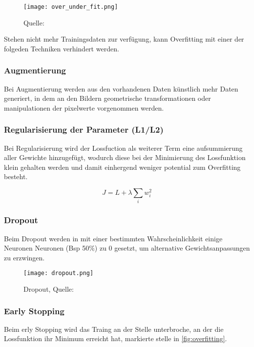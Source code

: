 \begin{figure}[H]
    \centering
    \texttt{[image: over\_under\_fit.png]}
    \caption{Quelle: \cite{deshpGuideImprovingDeep2017a}}
    \label{fig:over_under_fit}
\end{figure}


Stehen nicht mehr Trainingsdaten zur verfügung, kann Overfitting
mit einer der folgeden Techniken verhindert werden.


\subsubsection{Augmentierung}
Bei Augmentierung werden aus den vorhandenen Daten künstlich mehr 
Daten generiert, in dem an den Bildern geometrische transformationen 
oder manipulationen der pixelwerte vorgenommen werden.

\subsubsection{Regularisierung der Parameter (L1/L2)}
Bei Regularisierung wird der Lossfuction als weiterer Term
eine aufsummierung aller Gewichte hinzugefügt,
wodurch diese bei der Minimierung des Lossfunktion 
klein gehalten werden und damit einhergend weniger potential 
zum Overfitting besteht.

\begin{equation}
    \label{eq:regularization}
    J = L + \lambda \sum_{i} w_{i}^{2}
\end{equation}

\subsubsection{Dropout}
Beim Dropout werden in mit einer bestimmten Wahrscheinlichkeit 
einige Neuronen Neuronen (Bsp 50\%) zu 0 gesetzt, um 
alternative Gewichtsanpassungen zu erzwingen.

\begin{figure}[H]
    \centering
    \texttt{[image: dropout.png]}
    \caption{Dropout, Quelle: \cite{maksutovDeepStudyNot2018}}
    \label{fig:dropout}
\end{figure}

\subsubsection{Early Stopping}
Beim erly Stopping wird das Traing an der 
Stelle unterbroche, an der die Lossfunktion ihr 
Minimum erreicht hat, markierte stelle in 
\ref{fig:overfitting}.



